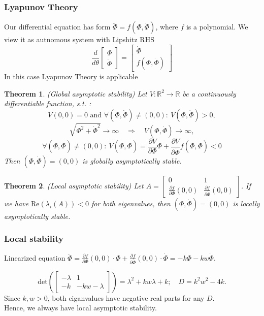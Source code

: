 \documentclass[12pt]{article}
\newtheorem{theorem}{Theorem}
\begin{document}
\subsubsection*{Lyapunov Theory}
Our differential equation has form $ \ddot{\Phi} = f(\Phi, \dot{\Phi})$, where $f$ is a polynomial. We view it as autnomous system with Lipshitz RHS
$$  \frac{d}{d\theta} \begin{bmatrix} \Phi \\ \dot{\Phi} \end{bmatrix} = \begin{bmatrix} \dot{\Phi} \\ f(\Phi, \dot{\Phi}) \end{bmatrix} $$
In this case Lyapunov Theory is applicable
\begin{theorem}(Global asymptotic stability) 
Let $V: \mathbb{R}^2 \to \mathbb{R}$ be a continuously differentiable function, s.t. :
$$V(0,0) = 0 \text{ and } \forall (\Phi, \dot{\Phi}) \neq (0, 0): ~V(\Phi, \dot{\Phi}) > 0  , $$
$$ \sqrt{\Phi^2 + \dot{\Phi}^2 } \to \infty \quad \Rightarrow \quad V(\Phi, \dot{\Phi}) \to \infty, $$
$$ \forall (\Phi, \dot{\Phi}) \neq (0, 0):  ~\dot{V}(\Phi, \dot{\Phi}) = \frac{\partial V}{\partial \Phi} \dot{\Phi} + \frac{\partial V}{\partial \dot{\Phi}} f(\Phi, \dot{\Phi}) < 0 $$
Then $(\Phi, \dot{\Phi}) = (0, 0)$ is globally asymptotically stable.
\end{theorem}

\begin{theorem}(Local asymptotic stability)
Let $A = \begin{bmatrix} 0 & 1 \\ \frac{\partial f}{\partial \Phi}(0,0) & \frac{\partial f}{\partial \dot{\Phi}}(0,0) \end{bmatrix}$. If we have $\mathrm{Re} (\lambda_i(A)) < 0$ for both eigenvalues, then $(\Phi, \dot{\Phi}) = (0, 0)$ is locally asymptotically stable.

\end{theorem}

\subsubsection*{Local stability}
Linearized equation $\ddot{\Phi} = \frac{\partial f}{\partial \Phi}(0,0) \cdot \Phi + \frac{\partial f}{\partial \dot{\Phi}}(0,0) \cdot \dot{\Phi} = -k\Phi - kw\dot{\Phi}$.

$$ \mathrm{det} \left( \begin{bmatrix} -\lambda & 1 \\ -k & -kw - \lambda \end{bmatrix} \right) = \lambda^2 + kw \lambda + k; \quad D = k^2w^2 - 4k. $$
Since $k, w > 0$, both eiganvalues have negative real parts for any $D$.
\\
Hence, we always have local asymptotic stability.
\end{document}
